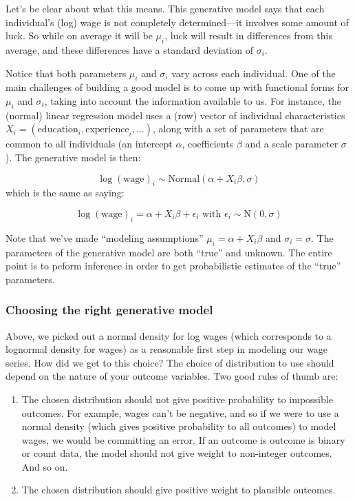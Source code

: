 \documentclass[]{book}
\providecommand{\tightlist}{%
  \setlength{\itemsep}{0pt}\setlength{\parskip}{0pt}}
\begin{document}
Let's be clear about what this means. This generative model says that
each individual's (log) wage is not completely determined---it involves
some amount of luck. So while on average it will be \(\mu_{i}\), luck
will result in differences from this average, and these differences have
a standard deviation of \(\sigma_{i}\).

Notice that both parameters \(\mu_{i}\) and \(\sigma_{i}\) vary across
each individual. One of the main challenges of building a good model is
to come up with functional forms for \(\mu_{i}\) and \(\sigma_{i}\),
taking into account the information available to us. For instance, the
(normal) linear regression model uses a (row) vector of individual
characteristics
\(X_{i} = (\mbox{education}_{i},\mbox{experience}_{i}, \dots)\), along
with a set of parameters that are common to all individuals (an
intercept \(\alpha\), coefficients \(\beta\) and a scale parameter
\(\sigma\)). The generative model is then:

\[
\log(\mbox{wage})_{i} \sim \mbox{Normal}(\alpha + X_{i}\beta, \sigma)
\] which is the same as saying:

\[
\log(\mbox{wage})_{i} = \alpha + X_{i}\beta + \epsilon_{i} \mbox{ with } \epsilon_{i} \sim \mbox{N}(0, \sigma)
\]

Note that we've made ``modeling assumptions''
\(\mu_{i} = \alpha + X_{i}\beta\) and \(\sigma_{i} = \sigma\). The
parameters of the generative model are both ``true'' and unknown. The
entire point is to peform inference in order to get probabilistic
estimates of the ``true'' parameters.

\subsubsection{Choosing the right generative
model}\label{choosing-the-right-generative-model}

Above, we picked out a normal density for log wages (which corresponds
to a lognormal density for wages) as a reasonable first step in modeling
our wage series. How did we get to this choice? The choice of
distribution to use should depend on the nature of your outcome
variables. Two good rules of thumb are:

\begin{enumerate}
\def\labelenumi{\arabic{enumi}.}
\tightlist
\item
  The chosen distribution should not give positive probability to
  impossible outcomes. For example, wages can't be negative, and so if
  we were to use a normal density (which gives positive probability to
  all outcomes) to model wages, we would be committing an error. If an
  outcome is outcome is binary or count data, the model should not give
  weight to non-integer outcomes. And so on.
\item
  The chosen distribution should give positive weight to plausible
  outcomes.
\end{enumerate}
\end{document}
